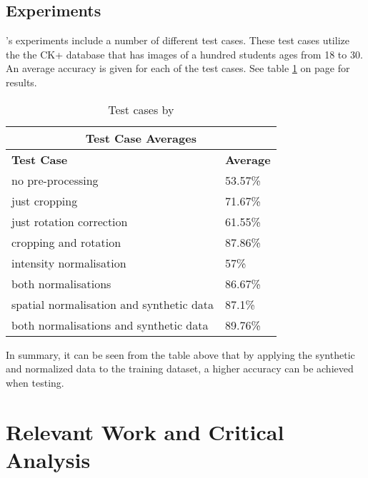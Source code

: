 \subsection{Experiments}
\citeauthor{LOPES}'s experiments include a number of different test cases. These test cases utilize the the CK+ database that has images of a hundred students ages from 18 to 30. An average accuracy is given for each of the test cases. See table \ref{table:testcases} on page \pageref{table:testcases} for results.

\begin{table}
\begin{tabular}{ |p{10cm}||p{3cm}|}
	\hline
	\multicolumn{2}{|c|}{Test Case Averages} \\
	\hline
 	\textbf{Test Case}& \textbf{Average}\\
	\hline
		no pre-processing  & 53.57\% \\
	\hline
		just cropping  & 71.67\%\\
	\hline
		just rotation correction  & 61.55\%\\
	\hline
		cropping and rotation  & 87.86\%\\
	\hline	
		intensity normalisation  & 57\%\\
	\hline
		both normalisations & 86.67\%\\
	\hline
		spatial normalisation and synthetic data & 87.1\%\\
	\hline
		both normalisations and synthetic data & 89.76\%\\
	\hline
\end{tabular}
\caption{Test cases by \citeauthor{LOPES}}
\label{table:testcases}
\end{table}


\newpage
In summary, it can be seen from the table above that by applying the synthetic and normalized data to the training dataset, a higher accuracy can be achieved when testing.

\section{Relevant Work and Critical Analysis}

